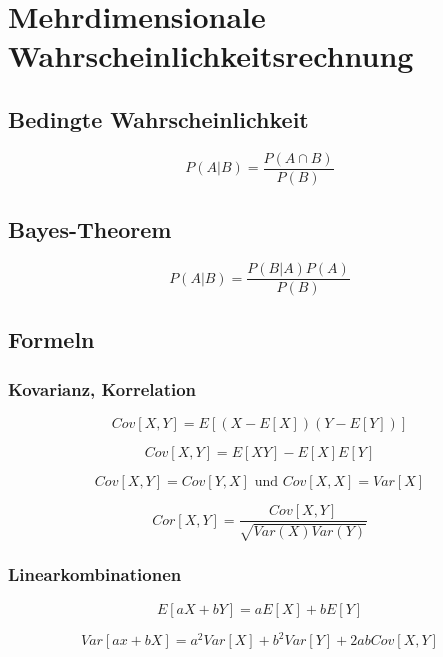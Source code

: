 \section{Mehrdimensionale Wahrscheinlichkeitsrechnung}

\subsection{Bedingte Wahrscheinlichkeit}

\begin{equation*}
    P(A|B)=\frac{P(A\cap B)}{P(B)}
\end{equation*}

\subsection{Bayes-Theorem}

\begin{equation*}
    P(A|B)=\frac{P(B|A)P(A)}{P(B)}
\end{equation*}

\subsection{Formeln}

\subsubsection{Kovarianz, Korrelation}
\begin{equation*}
    Cov[X,Y]=E[(X-E[X])(Y-E[Y])]
\end{equation*}

\begin{equation*}
    Cov[X,Y]=E[XY]-E[X]E[Y]
\end{equation*}

\begin{equation*}
    Cov[X,Y]=Cov[Y,X] \text{ und } Cov[X,X]=Var[X]
\end{equation*}

\begin{equation*}
    Cor[X,Y]=\frac{Cov[X,Y]}{\sqrt{Var(X)Var(Y)}}
\end{equation*}

\subsubsection{Linearkombinationen}
\begin{equation*}
    E[aX+bY]=aE[X]+bE[Y]
\end{equation*}

\begin{equation*}
    Var[ax+bX]=a^2Var[X]+b^2Var[Y]+2abCov[X,Y]
\end{equation*}